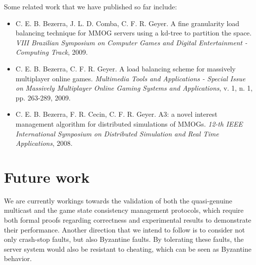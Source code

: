 \documentclass[]{usiinfprospectus}
\begin{document}
Some related work that we have published so far include:
\begin{itemize}
  \item C. E. B. Bezerra, J. L. D. Comba, C. F. R. Geyer. A fine granularity load balancing technique for MMOG servers using a kd-tree to partition the space. \textit{VIII Brazilian Symposium on Computer Games and Digital Entertainment - Computing Track}, 2009.
  \item C. E. B. Bezerra, C. F. R. Geyer. A load balancing scheme for massively multiplayer online games. \textit{Multimedia Tools and Applications - Special Issue on Massively Multiplayer Online Gaming Systems and Applications}, v. 1, n. 1, pp. 263-289, 2009.
  \item C. E. B. Bezerra, F. R. Cecin, C. F. R. Geyer. A3: a novel interest management algorithm for distributed simulations of MMOGs. \textit{12-th IEEE International Symposium on Distributed Simulation and Real Time Applications}, 2008.
\end{itemize}

\section{Future work} \label{sec:futurework}

We are currently workings towards the validation of both the quasi-genuine multicast and the game state consistency management protocols, which require both formal proofs regarding correctness and experimental results to demonstrate their performance. Another direction that we intend to follow is to consider not only crash-stop faults, but also Byzantine faults. By tolerating these faults, the server system would also be resistant to cheating, which can be seen as Byzantine behavior.




\end{document}
